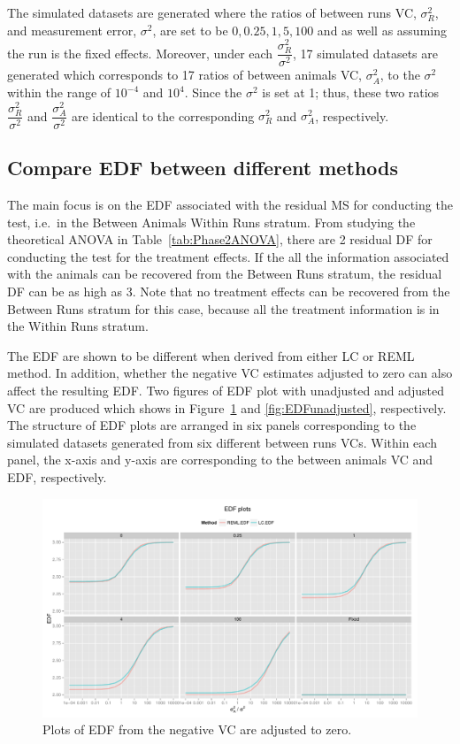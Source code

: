 \documentclass[12pt,a4paper]{article}
\begin{document}
The simulated datasets are generated where the ratios of between runs VC, $\sigma_R^2$, and measurement error, $\sigma^2$, are set to be $0, 0.25, 1, 5, 100$ and as well as assuming the run is the fixed effects. Moreover, under each $\dfrac{\sigma_R^2}{\sigma^2}$, 17 simulated datasets are generated which corresponds to 17 ratios of between animals VC, $\sigma_A^2$, to the $\sigma^2$ within the range of $10^{-4}$ and $10^4$. Since the $\sigma^2$ is set at 1; thus, these two ratios $\dfrac{\sigma_R^2}{\sigma^2}$ and $\dfrac{\sigma_A^2}{\sigma^2}$ are identical to the corresponding $\sigma_R^2$ and $\sigma_A^2$, respectively. 

\subsection{Compare EDF between different methods}
The main focus is on the EDF associated with the residual MS for conducting the test, i.e.\ in the Between Animals Within Runs stratum. From studying the theoretical ANOVA in Table~\ref{tab:Phase2ANOVA}, there are 2 residual DF for conducting the test for the treatment effects. If the all the information associated with the animals can be recovered from the Between Runs stratum, the residual DF can be as high as 3. Note that no treatment effects can be recovered from the Between Runs stratum for this case, because all the treatment information is in the Within Runs stratum. 

The EDF are shown to be different when derived from either LC or REML method. In addition, whether the negative VC estimates adjusted to zero can also affect the resulting EDF. Two figures of EDF plot with unadjusted and adjusted VC are produced which shows in Figure~\ref{fig:EDFadjusted} and \ref{fig:EDFunadjusted}, respectively. The structure of EDF plots are arranged in six panels corresponding to the simulated datasets generated from six different between runs VCs. Within each panel, the x-axis and y-axis are corresponding to the between animals VC and EDF, respectively. 

\begin{figure}[ht]
\centering
\includegraphics[width=1 \textwidth]{Graph/CRD232Tag4.pdf}
\caption{Plots of EDF from the negative VC are adjusted to zero.}
\label{fig:EDFadjusted}
\end{figure}
\end{document}
